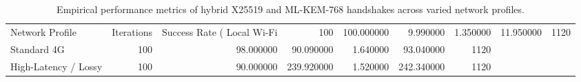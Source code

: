 \begin{table}
\caption{Empirical performance metrics of hybrid X25519 and ML-KEM-768 handshakes across varied network profiles.}
\label{tab:hybrid_benchmarks}
\begin{tabular}{lrrrrrr}
\toprule
Network Profile & Iterations & Success Rate (%
\midrule
Local Wi-Fi & 100 & 100.000000 & 9.990000 & 1.350000 & 11.950000 & 1120 \\
Standard 4G & 100 & 98.000000 & 90.090000 & 1.640000 & 93.040000 & 1120 \\
High-Latency / Lossy & 100 & 90.000000 & 239.920000 & 1.520000 & 242.340000 & 1120 \\
\bottomrule
\end{tabular}
\end{table}
